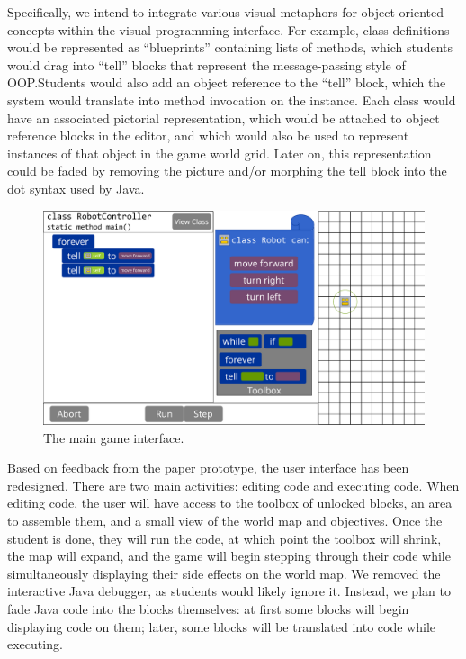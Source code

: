 \documentclass[12pt,notitlepage]{article}
\begin{document}
Specifically, we intend to integrate various visual metaphors for
object-oriented concepts within the visual programming interface. For
example, class definitions would be represented as ``blueprints''
containing lists of methods, which students would drag into ``tell''
blocks that represent the message-passing style of OOP.\@ Students
would also add an object reference to the ``tell'' block, which the
system would translate into method invocation on the instance. Each
class would have an associated pictorial representation, which would
be attached to object reference blocks in the editor, and which would
also be used to represent instances of that object in the game world
grid. Later on, this representation could be faded by removing the
picture and/or morphing the tell block into the dot syntax used by
Java.

\begin{figure}[h]
  \centering
  \includegraphics[width=\textwidth]{mockup.pdf}
  \caption{The main game interface.}
\end{figure}

Based on feedback from the paper prototype, the user interface has
been redesigned. There are two main activities: editing code and
executing code. When editing code, the user will have access to the
toolbox of unlocked blocks, an area to assemble them, and a small view
of the world map and objectives. Once the student is done, they will
run the code, at which point the toolbox will shrink, the map will
expand, and the game will begin stepping through their code while
simultaneously displaying their side effects on the world map. We
removed the interactive Java debugger, as students would likely ignore
it. Instead, we plan to fade Java code into the blocks themselves: at
first some blocks will begin displaying code on them; later, some
blocks will be translated into code while executing.
\end{document}
